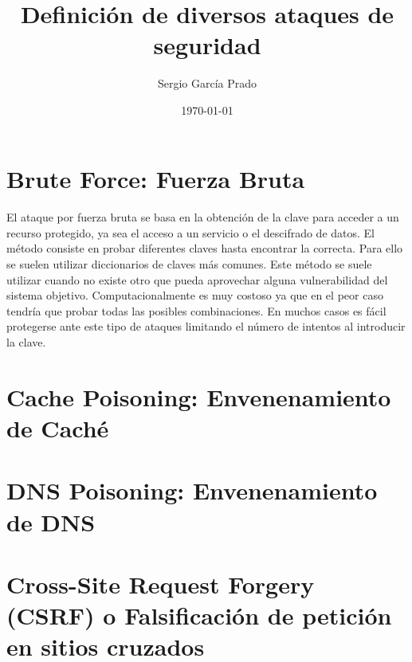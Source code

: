 \documentclass[10pt, a4paper,spanish]{article}
\title{\vspace{-15mm}\fontsize{24pt}{10pt}\selectfont\textbf{Definición de diversos ataques de seguridad}} %
\author{Sergio García Prado}
\date{\today}
\begin{document}
	\maketitle %
	\thispagestyle{fancy} %



    \section{Brute Force: Fuerza Bruta}
        \paragraph{}
		El ataque por fuerza bruta se basa en la obtención de la clave para acceder a un recurso protegido, ya sea el acceso a un servicio o el descifrado de datos. El método consiste en probar diferentes claves hasta encontrar la correcta. Para ello se suelen utilizar diccionarios de claves más comunes. Este método se suele utilizar cuando no existe otro que pueda aprovechar alguna vulnerabilidad del sistema objetivo. Computacionalmente es muy costoso ya que en el peor caso tendría que probar todas las posibles combinaciones. En muchos casos es fácil protegerse ante este tipo de ataques limitando el número de intentos al introducir la clave.


    \section{Cache Poisoning: Envenenamiento de Caché}
        \paragraph{}


    \section{DNS Poisoning: Envenenamiento de DNS}
        \paragraph{}


    \section{Cross-Site Request Forgery (CSRF) o Falsificación de petición en sitios cruzados}
\end{document}
